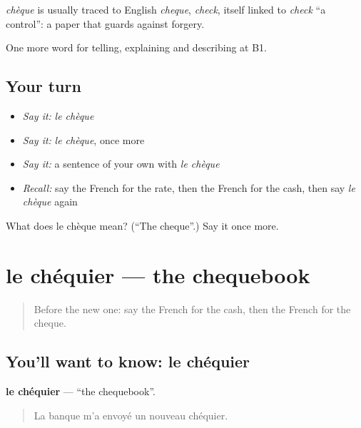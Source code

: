 \begin{cousinweb}
\emph{chèque} is usually traced to English \emph{cheque}, \emph{check}, itself linked to \emph{check} \textquotedblleft{}a control\textquotedblright{}: a paper that guards against forgery.
\end{cousinweb}

\begin{grammarlens}[title={What you've built}]
One more word for telling, explaining and describing at B1.
\end{grammarlens}

\subsection*{Your turn}
\begin{itemize}
\raggedright
  \item \emph{Say it:} \emph{le chèque}
  \item \emph{Say it:} \emph{le chèque}, once more
  \item \emph{Say it:} a sentence of your own with \emph{le chèque}
  \item \emph{Recall:} say the French for the rate, then the French for the cash, then say \emph{le chèque} again
\end{itemize}

\begin{tcolorbox}[breakable,colback=teal!4,colframe=teal!35!black,title={Before you move on}]
What does le chèque mean? (\textquotedblleft{}The cheque\textquotedblright{}.) Say it once more.
\end{tcolorbox}
\section[le chéquier]{le chéquier — the chequebook}

\label{lesson:FR-C392-chequier}



\begin{quote}
Before the new one: say the French for the cash, then the French for the cheque.
\end{quote}

\subsection*{You'll want to know: le chéquier}
\textbf{le chéquier} — \textquotedblleft{}the chequebook\textquotedblright{}.

\begin{quote}
La banque m'a envoyé un nouveau chéquier.
\end{quote}

